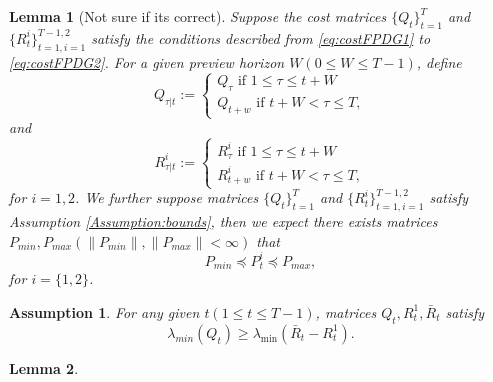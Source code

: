 \documentclass[letterpaper, 10 pt, conference]{ieeeconf}  %
\newtheorem{lemma}{Lemma}
\newtheorem{assumption}{Assumption}
\begin{document}
\begin{lemma}[Not sure if its correct]
    Suppose the cost matrices $\{Q_{t}\}_{t=1}^{T}$ and $\{R_{t}^{i}\}_{t=1,i=1}^{T-1,2}$ satisfy the conditions described from \eqref{eq:costFPDG1} to \eqref{eq:costFPDG2}.
    For a given preview horizon $W(0\leq W \leq T-1)$, define
    \begin{equation}
        Q_{\tau|t}:= 
        \begin{cases}
            Q_{\tau} \text{ if $1\leq \tau \leq t+W$}\\
            Q_{t+w} \text{ if $t+W < \tau \leq T$},
        \end{cases}
    \end{equation}
    and
    \begin{equation}
        R_{\tau|t}^{i}:= 
        \begin{cases}
            R_{\tau}^{i} \text{ if $1\leq \tau \leq t+W$}\\
            R_{t+w}^{i} \text{ if $t+W < \tau \leq T$},
        \end{cases}
    \end{equation}
    for $i = {1,2}$.
    We further suppose matrices $\{Q_{t}\}_{t=1}^{T}$ and $\{R_{t}^{i}\}_{t=1,i=1}^{T-1,2}$ satisfy Assumption \ref{Assumption:bounds}, then we expect there exists matrices $P_{min},P_{max}(\|P_{min}\|,\|P_{max}\|<\infty)$ that
    \begin{equation*}
        P_{min} \preceq P_{t}^{i} \preceq P_{max},
    \end{equation*}
    for $i = \{1,2\}$.
\end{lemma}
\begin{assumption}
    For any given $t(1\leq t \leq T-1)$, matrices $Q_{t}, R_{t}^{1}, \bar{R}_{t}$ satisfy
    \begin{equation}
        \lambda_{min}(Q_{t}) \geq \lambda_{\min}(\bar{R}_{t}-R_{t}^{1}).
    \end{equation}
\end{assumption}

\begin{lemma}
    
\end{lemma}
\end{document}
